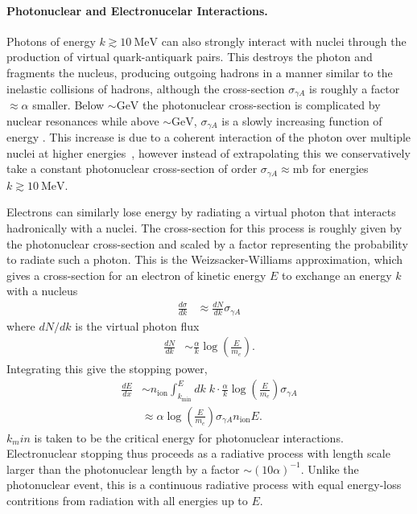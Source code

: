 \documentclass[twocolumn, preprintnumbers,amsmath,amssymb,prd, superscriptaddress]{revtex4}
\newcommand{\GeV}{\text{GeV}}
\def\r{\right)}
\def\l{\left(}
\begin{document}
\begin{appendices}
\paragraph{Photonuclear and Electronucelar Interactions.}
Photons of energy $k \gtrsim 10 ~\text{MeV}$ can also strongly interact with nuclei through the production of virtual quark-antiquark pairs.
This destroys the photon and fragments the nucleus, producing outgoing hadrons in a manner similar to the inelastic collisions of hadrons, although the cross-section $\sigma_{\gamma A}$ is roughly a factor $\approx \alpha$ smaller.
Below $\sim \GeV$ the photonuclear cross-section is complicated by nuclear resonances while above $\sim \GeV$, $\sigma_{\gamma A}$ is a slowly increasing function of energy \cite{Tavernier}.
This increase is due to a coherent interaction of the photon over multiple nuclei at higher energies~\cite{Gerhardt:2010bj}, however instead of extrapolating this we conservatively take a constant photonuclear cross-section of order $\sigma_{\gamma A} \approx \text{mb}$ for energies $k \gtrsim 10 ~\text{MeV}$.

Electrons can similarly lose energy by radiating a virtual photon that interacts hadronically with a nuclei.
The cross-section for this process is roughly given by the photonuclear cross-section and scaled by a factor representing the probability to radiate such a photon.
This is the Weizsacker-Williams approximation, which gives a cross-section for an electron of kinetic energy $E$ to exchange an energy $k$ with a nucleus
\begin{align}
    \frac{d\sigma}{dk} &\approx \frac{dN}{dk} \sigma_{\gamma A}
\end{align}
where $dN/dk$ is the virtual photon flux \cite{Gerhardt:2010bj}
\begin{align}
    \frac{dN}{dk} &\sim \frac{\alpha}{k} \log\l \frac{E}{m_e} \r.
\end{align}
Integrating this give the stopping power,
\begin{align}
    \frac{dE}{dx} &\sim n_\text{ion} \int_{k_\text{min}}^E dk \;
    k \cdot \frac{\alpha}{k} \log\l \frac{E}{m_e} \r  \sigma_{\gamma A} \\
    &\approx \alpha \log\l \frac{E}{m_e} \r \sigma_{\gamma A} n_\text{ion} E.
\end{align}
$k_min$ is taken to be the critical energy for photonuclear interactions.
Electronuclear stopping thus proceeds as a radiative process with length scale larger than the photonuclear length by a factor $\sim (10 \alpha)^{-1}$.
Unlike the photonuclear event, this is a continuous radiative process with equal energy-loss contritions from radiation with all energies up to $E$.


\end{appendices}
\end{document}
